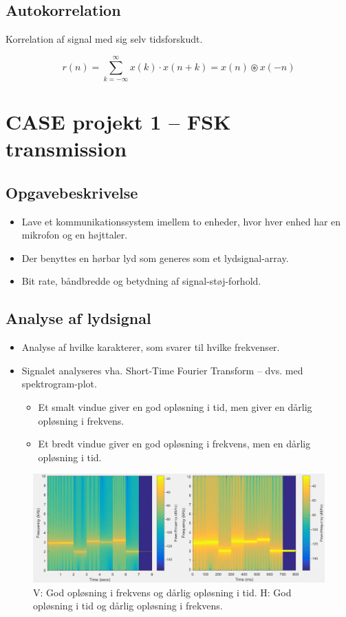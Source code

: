 \documentclass[danish]{article}
\begin{document}
\subsection{Autokorrelation}
Korrelation af signal med sig selv tidsforskudt.

\begin{equation}
r(n) = \sum_{k=-\infty}^{\infty} x(k) \cdot x(n+k) = x(n) \circledast x(-n)
\end{equation}

\newpage
\section{CASE projekt 1 – FSK transmission}
\subsection{Opgavebeskrivelse}
\begin{itemize}
	\item Lave et kommunikationssystem imellem to enheder, hvor hver enhed har en mikrofon og en højttaler. 
	\item Der benyttes en hørbar lyd som generes som et lydsignal-array.
	\item Bit rate, båndbredde og betydning af signal-støj-forhold.
\end{itemize}

\subsection{Analyse af lydsignal}
\begin{itemize}
	\item Analyse af hvilke karakterer, som svarer til hvilke frekvenser. 
	\item Signalet analyseres vha. Short-Time Fourier Transform – dvs. med spektrogram-plot.
	\begin{itemize}
		\item Et smalt vindue giver en god opløsning i tid, men giver en dårlig opløsning i frekvens.
		\item Et bredt vindue giver en god opløsning i frekvens, men en dårlig opløsning i tid.
	\end{itemize}
\end{itemize}

\begin{figure}[H]
	\centering
	\includegraphics[width=\linewidth]{graphics/case1_2}
	\caption{V: God opløsning i frekvens og dårlig opløsning i tid. H: God opløsning i tid og dårlig opløsning i frekvens.}
	\label{fig:case1_2}
\end{figure}
\end{document}
